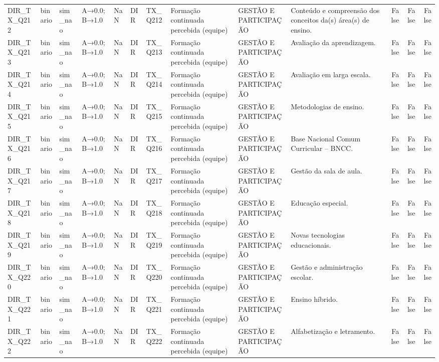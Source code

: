 \begin{tabular}{llllllllllrrr}
DIR\_TX\_Q212 & binario & sim\_nao & A→0.0; B→1.0 & NaN & DIR & TX\_Q212 & Formação continuada percebida (equipe) & GESTÃO E PARTICIPAÇÃO & Conteúdo e compreensão dos conceitos da(s) área(s) de ensino. & False & False & False \\
DIR\_TX\_Q213 & binario & sim\_nao & A→0.0; B→1.0 & NaN & DIR & TX\_Q213 & Formação continuada percebida (equipe) & GESTÃO E PARTICIPAÇÃO & Avaliação da aprendizagem. & False & False & False \\
DIR\_TX\_Q214 & binario & sim\_nao & A→0.0; B→1.0 & NaN & DIR & TX\_Q214 & Formação continuada percebida (equipe) & GESTÃO E PARTICIPAÇÃO & Avaliação em larga escala. & False & False & False \\
DIR\_TX\_Q215 & binario & sim\_nao & A→0.0; B→1.0 & NaN & DIR & TX\_Q215 & Formação continuada percebida (equipe) & GESTÃO E PARTICIPAÇÃO & Metodologias de ensino. & False & False & False \\
DIR\_TX\_Q216 & binario & sim\_nao & A→0.0; B→1.0 & NaN & DIR & TX\_Q216 & Formação continuada percebida (equipe) & GESTÃO E PARTICIPAÇÃO & Base Nacional Comum Curricular – BNCC. & False & False & False \\
DIR\_TX\_Q217 & binario & sim\_nao & A→0.0; B→1.0 & NaN & DIR & TX\_Q217 & Formação continuada percebida (equipe) & GESTÃO E PARTICIPAÇÃO & Gestão da sala de aula. & False & False & False \\
DIR\_TX\_Q218 & binario & sim\_nao & A→0.0; B→1.0 & NaN & DIR & TX\_Q218 & Formação continuada percebida (equipe) & GESTÃO E PARTICIPAÇÃO & Educação especial. & False & False & False \\
DIR\_TX\_Q219 & binario & sim\_nao & A→0.0; B→1.0 & NaN & DIR & TX\_Q219 & Formação continuada percebida (equipe) & GESTÃO E PARTICIPAÇÃO & Novas tecnologias educacionais. & False & False & False \\
DIR\_TX\_Q220 & binario & sim\_nao & A→0.0; B→1.0 & NaN & DIR & TX\_Q220 & Formação continuada percebida (equipe) & GESTÃO E PARTICIPAÇÃO & Gestão e administração escolar. & False & False & False \\
DIR\_TX\_Q221 & binario & sim\_nao & A→0.0; B→1.0 & NaN & DIR & TX\_Q221 & Formação continuada percebida (equipe) & GESTÃO E PARTICIPAÇÃO & Ensino híbrido. & False & False & False \\
DIR\_TX\_Q222 & binario & sim\_nao & A→0.0; B→1.0 & NaN & DIR & TX\_Q222 & Formação continuada percebida (equipe) & GESTÃO E PARTICIPAÇÃO & Alfabetização e letramento. & False & False & False \\

\end{tabular}
